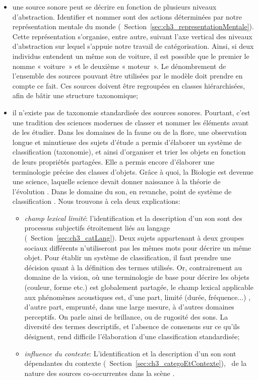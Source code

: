 \begin{itemize}
\item une source sonore peut se décrire en fonction de plusieurs niveaux d'abstraction. Identifier et nommer sont des actions déterminées par notre représentation mentale du monde (\cf~Section~\ref{sec:ch3_representationMentale}). Cette représentation s'organise, entre autre, suivant l'axe vertical des niveaux d'abstraction sur lequel s'appuie notre travail de catégorisation. Ainsi, si deux individus entendent un même son de voiture, il est possible que le premier le nomme « voiture~» et le deuxième « moteur~». Le dénombrement de l'ensemble des sources pouvant être utilisées par le modèle doit prendre en compte ce fait. Ces sources doivent être regroupées en classes hiérarchisées, afin de bâtir une structure taxonomique;
\item il n'existe pas de taxonomie standardisée des sources sonores. Pourtant, c'est une tradition des sciences modernes de classer et nommer les éléments avant de les étudier. Dans les domaines de la faune ou de la flore, une observation longue et minutieuse des sujets d'étude a permis d'élaborer un système de classification (taxonomie), et ainsi d'organiser et trier les objets en fonction de leurs propriétés partagées. Elle a permis encore d'élaborer une terminologie précise des classes d'objets. Grâce à quoi, la Biologie est devenue une science, laquelle science devait donner naissance à la théorie de l'évolution \citep{lecointre2006tree}. Dans le domaine du son, en revanche, point de système de classification \citep{dubois2000categories,niessen2010categories}. Nous trouvons à cela deux explications:

\begin{itemize}
\item \emph{champ lexical limité}: l'identification et la description d'un son sont des processus subjectifs étroitement liés au langage (\cf~Section~\ref{sec:ch3_catLang}). Deux sujets appartenant à deux groupes sociaux différents n'utiliseront pas les mêmes mots pour décrire un même objet. Pour établir un système de classification, il faut prendre une décision quant à la définition des termes utilisés. Or, contrairement au domaine de la vision, où une terminologie de base pour décrire les objets (couleur, forme etc.) est globalement partagée, le champ lexical applicable aux phénomènes acoustiques est, d'une part, limité (durée, fréquence...) \citep{dubois2000categories}, d'autre part, emprunté, dans une large mesure, à d'autres domaines perceptifs. On parle ainsi de brillance, ou de rugosité des sons. La diversité des termes descriptifs, et l'absence de consensus sur ce qu'ils désignent, rend difficile l'élaboration d'une classification standardisée;
\item \emph{influence du contexte}: L'identification et la description d'un son sont dépendantes du contexte (\cf~Section~\ref{sec:ch3_categoEtContexte}), \ie~de la nature des sources co-occurrentes dans la scène \citep{ballas1987interpreting,niessen2008disambiguating,gygi2011incongruency}.
\end{itemize}
\end{itemize}

